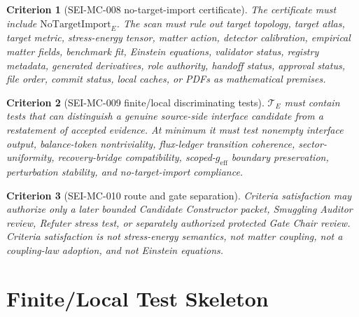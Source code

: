 \documentclass[11pt]{article}
\newcommand{\geff}{g_{\mathrm{eff}}}
\newcommand{\NoTargetImport}{\mathrm{NoTargetImport}}
\newtheorem{criterion}{Criterion}
\begin{document}
\begin{criterion}[SEI-MC-008 no-target-import certificate]
The certificate must include \(\NoTargetImport_E\). The scan must rule out
target topology, target atlas, target metric, stress-energy tensor, matter
action, detector calibration, empirical matter fields, benchmark fit,
Einstein equations, validator status, registry metadata, generated
derivatives, role authority, handoff status, approval status, file order,
commit status, local caches, or PDFs as mathematical premises.
\end{criterion}

\begin{criterion}[SEI-MC-009 finite/local discriminating tests]
\(\mathcal{T}_E\) must contain tests that can distinguish a genuine
source-side interface candidate from a restatement of accepted evidence. At
minimum it must test nonempty interface output, balance-token nontriviality,
flux-ledger transition coherence, sector-uniformity, recovery-bridge
compatibility, scoped-\(\geff\) boundary preservation, perturbation stability,
and no-target-import compliance.
\end{criterion}

\begin{criterion}[SEI-MC-010 route and gate separation]
Criteria satisfaction may authorize only a later bounded Candidate
Constructor packet, Smuggling Auditor review, Refuter stress test, or
separately authorized protected Gate Chair review. Criteria satisfaction is
not stress-energy semantics, not matter coupling, not a coupling-law adoption,
and not Einstein equations.
\end{criterion}

\section{Finite/Local Test Skeleton}
\end{document}
